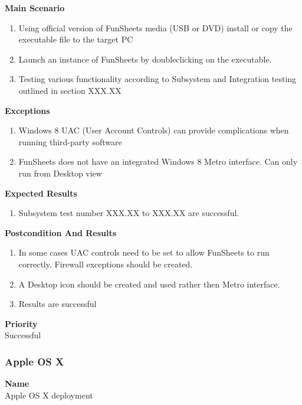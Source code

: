 \documentclass[12pt]{article}
\begin{document}
\noindent
{\bf Main Scenario}\
\vspace*{-0.2in}
\begin{enumerate}
\item Using official version of FunSheets media (USB or DVD) install or copy the executable file to the target PC
\item Launch an instance of FunSheets by doubleclicking on the executable.
\item Testing various functionality according to Subsystem and Integration testing outlined in section XXX.XX
\end{enumerate}

{\bf Exceptions}\
\begin{enumerate}
\item Windows 8 UAC (User Account Controls) can provide complications when running third-party software
\item FunSheets does not have an integrated Windows 8 Metro interface. Can only run from Desktop view
\end{enumerate}

{\bf Expected Results}\
\begin{enumerate}
\item Subsystem test number XXX.XX to XXX.XX are successful.
\end{enumerate}

{\bf Postcondition And Results}\
\begin{enumerate}
\item In some cases UAC controls need to be set to allow FunSheets to run correctly. Firewall exceptions should be created.
\item A Desktop icon should be created and used rather then Metro interface.
\item Results are successful
\end{enumerate}

\noindent
{\bf Priority}\\
Successful
\noindent

\clearpage
\subsubsection{Apple OS X} \label{uc:1}

\noindent
{\bf Name}\\
Apple OS X deployment
\end{document}
